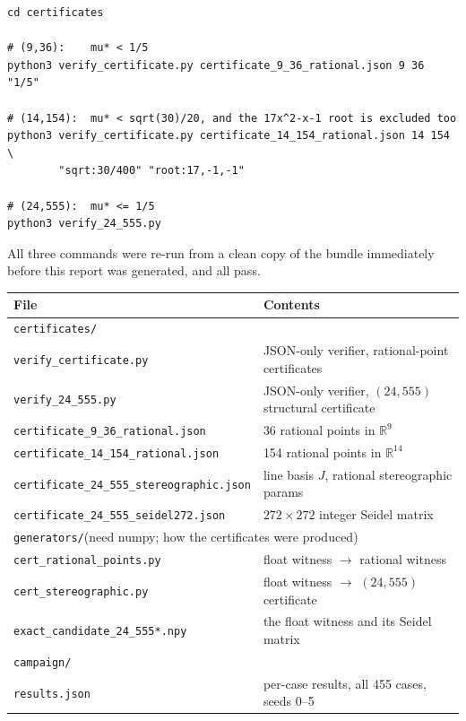\documentclass[11pt,a4paper]{article}
\begin{document}
\begin{verbatim}
cd certificates

# (9,36):    mu* < 1/5
python3 verify_certificate.py certificate_9_36_rational.json 9 36 "1/5"

# (14,154):  mu* < sqrt(30)/20, and the 17x^2-x-1 root is excluded too
python3 verify_certificate.py certificate_14_154_rational.json 14 154 \
        "sqrt:30/400" "root:17,-1,-1"

# (24,555):  mu* <= 1/5
python3 verify_24_555.py
\end{verbatim}

\noindent
All three commands were re-run from a clean copy of the bundle immediately before this
report was generated, and all pass.

{\small
\begin{longtable}{ll}
\toprule
File & Contents \\
\midrule
\endhead
\multicolumn{2}{l}{\texttt{certificates/}} \\
\quad\texttt{verify\_certificate.py}       & JSON-only verifier, rational-point certificates \\
\quad\texttt{verify\_24\_555.py}             & JSON-only verifier, $(24,555)$ structural certificate \\
\quad\texttt{certificate\_9\_36\_rational.json}   & 36 rational points in $\mathbb{R}^9$ \\
\quad\texttt{certificate\_14\_154\_rational.json} & 154 rational points in $\mathbb{R}^{14}$ \\
\quad\texttt{certificate\_24\_555\_stereographic.json} & line basis $J$, rational stereographic params \\
\quad\texttt{certificate\_24\_555\_seidel272.json}    & $272\times272$ integer Seidel matrix \\
\multicolumn{2}{l}{\texttt{generators/}\quad (need numpy; how the certificates were produced)} \\
\quad\texttt{cert\_rational\_points.py}    & float witness $\to$ rational witness \\
\quad\texttt{cert\_stereographic.py}       & float witness $\to$ $(24,555)$ certificate \\
\quad\texttt{exact\_candidate\_24\_555*.npy} & the float witness and its Seidel matrix \\
\multicolumn{2}{l}{\texttt{campaign/}} \\
\quad\texttt{results.json}                 & per-case results, all 455 cases, seeds 0--5 \\

\end{longtable}}
\end{document}
